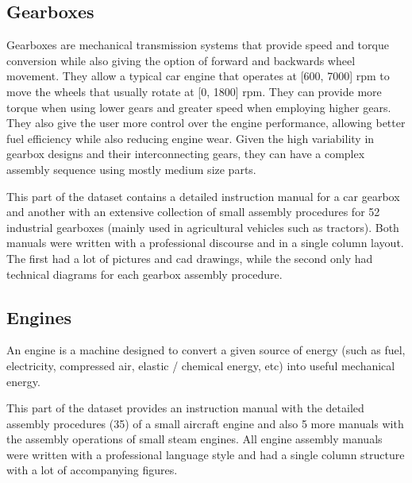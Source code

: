 \subsection{Gearboxes}

Gearboxes are mechanical transmission systems that provide speed and torque conversion while also giving the option of forward and backwards wheel movement. They allow a typical car engine that operates at [600, 7000] \gls{rpm} to move the wheels that usually rotate at [0, 1800] \gls{rpm}. They can provide more torque when using lower gears and greater speed when employing higher gears. They also give the user more control over the engine performance, allowing better fuel efficiency while also reducing engine wear. Given the high variability in gearbox designs and their interconnecting gears, they can have a complex assembly sequence using mostly medium size parts.

This part of the dataset contains a detailed instruction manual for a car gearbox and another with an extensive collection of small assembly procedures for 52 industrial gearboxes (mainly used in agricultural vehicles such as tractors). Both manuals were written with a professional discourse and in a single column layout. The first had a lot of pictures and \gls{cad} drawings, while the second only had technical diagrams for each gearbox assembly procedure.


\subsection{Engines}

An engine is a machine designed to convert a given source of energy (such as fuel, electricity, compressed air, elastic / chemical energy, etc) into useful mechanical energy.

This part of the dataset provides an instruction manual with the detailed assembly procedures (35) of a small aircraft engine and also 5 more manuals with the assembly operations of small steam engines. All engine assembly manuals were written with a professional language style and had a single column structure with a lot of accompanying figures.

